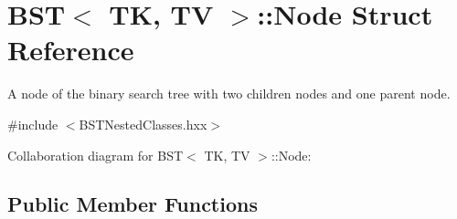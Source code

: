 \hypertarget{structBST_1_1Node}{}\section{B\+ST$<$ TK, TV $>$\+:\+:Node Struct Reference}
\label{structBST_1_1Node}


A node of the binary search tree with two children nodes and one parent node.  




{\ttfamily \#include $<$B\+S\+T\+Nested\+Classes.\+hxx$>$}



Collaboration diagram for B\+ST$<$ TK, TV $>$\+:\+:Node\+:
\subsection*{Public Member Functions}
